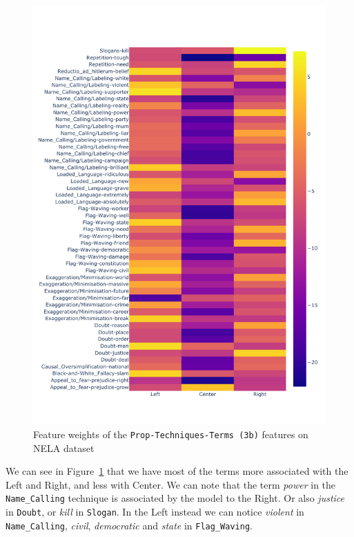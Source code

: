 \begin{figure}[!htbp]
    \centering
    \includegraphics[trim={0 1cm 0 1cm},clip,width=\textwidth]{figures/nela_allsides_subset_media_balanced_weights_propaganda_techniques_tf_idf_2.pdf}
    \caption{Feature weights of the \texttt{Prop-Techniques-Terms (3b)} features on NELA dataset}
    \label{fig:nela_weights_prop_tech_terms}
\end{figure}

We can see in Figure~\ref{fig:nela_weights_prop_tech_terms} that we have most of the terms more associated with the Left and Right, and less with Center. We can note that the term \textit{power} in the \texttt{Name\_Calling} technique is associated by the model to the Right. Or also \textit{justice} in \texttt{Doubt}, or \textit{kill} in \texttt{Slogan}.
In the Left instead we can notice \textit{violent} in \texttt{Name\_Calling}, \textit{civil}, \textit{democratic} and \textit{state} in \texttt{Flag\_Waving}.



